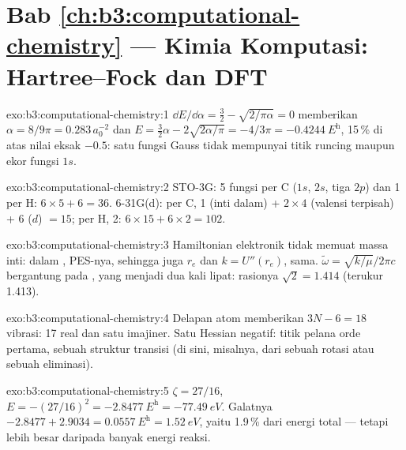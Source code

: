 \section*{Bab \ref{ch:b3:computational-chemistry} --- Kimia Komputasi: Hartree--Fock dan DFT}

\begin{solution}{exo:b3:computational-chemistry:1}
$\dd E/\dd\alpha = \frac32 - \sqrt{2/\pi\alpha} = 0$ memberikan $\alpha = 8/9\pi = 0.283\,
a_0^{-2}$ dan $E = \frac32\alpha - 2\sqrt{2\alpha/\pi} = -4/3\pi = \qty{-0.4244}{\hartree}$,
15\,\% di atas nilai eksak $-0.5$: satu fungsi Gauss tidak mempunyai titik
runcing maupun ekor fungsi $1s$.
\end{solution}

\begin{solution}{exo:b3:computational-chemistry:2}
STO-3G: 5 fungsi per C ($1s$, $2s$, tiga $2p$) dan 1 per H: $6 \times 5 + 6 =
36$. 6-31G(d): per C, 1 (inti dalam) + $2 \times 4$ (valensi terpisah) + 6 ($d$)
$= 15$; per H, 2: $6 \times 15 + 6 \times 2 = 102$.
\end{solution}

\begin{solution}{exo:b3:computational-chemistry:3}
Hamiltonian elektronik tidak memuat massa inti: dalam , PES-nya, sehingga juga $r_e$ dan $k = U''(r_e)$, sama.
$\tilde\omega = \sqrt{k/\mu}/2\pi c$ bergantung pada , yang
menjadi dua kali lipat: rasionya $\sqrt2 = 1.414$ (terukur 1.413).
\end{solution}

\begin{solution}{exo:b3:computational-chemistry:4}
Delapan atom memberikan $3N - 6 = 18$ vibrasi: 17 real dan satu imajiner.
Satu  Hessian negatif: titik pelana orde pertama, sebuah struktur
transisi (di sini, misalnya, dari sebuah rotasi atau sebuah eliminasi).
\end{solution}

\begin{solution}{exo:b3:computational-chemistry:5}
$\zeta = 27/16$, $E = -(27/16)^2 = \qty{-2.8477}{\hartree} = \qty{-77.49}{eV}$.
Galatnya $-2.8477 + 2.9034 = \qty{0.0557}{\hartree} = \qty{1.52}{eV}$, yaitu
1.9\,\% dari energi total --- tetapi lebih besar daripada banyak energi reaksi.
\end{solution}

